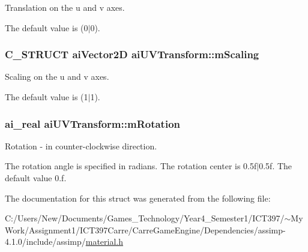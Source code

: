 Translation on the u and v axes.

The default value is (0$|$0). \hypertarget{structai_u_v_transform_89429a027cbf914e7212e48149a957c8}{
\subsubsection[mScaling]{\setlength{\rightskip}{0pt plus 5cm}C\_\-STRUCT {\bf aiVector2D} {\bf aiUVTransform::mScaling}}}
\label{structai_u_v_transform_89429a027cbf914e7212e48149a957c8}


Scaling on the u and v axes.

The default value is (1$|$1). \hypertarget{structai_u_v_transform_157005aadfdd145a56c7831c7b24f1ea}{
\subsubsection[mRotation]{\setlength{\rightskip}{0pt plus 5cm}ai\_\-real {\bf aiUVTransform::mRotation}}}
\label{structai_u_v_transform_157005aadfdd145a56c7831c7b24f1ea}


Rotation - in counter-clockwise direction.

The rotation angle is specified in radians. The rotation center is 0.5f$|$0.5f. The default value 0.f. 

The documentation for this struct was generated from the following file:\begin{CompactItemize}
\item 
C:/Users/New/Documents/Games\_\-Technology/Year4\_\-Semester1/ICT397/$\sim$My Work/Assignment1/ICT397Carre/CarreGameEngine/Dependencies/assimp-4.1.0/include/assimp/\hyperlink{material_8h}{material.h}\end{CompactItemize}
